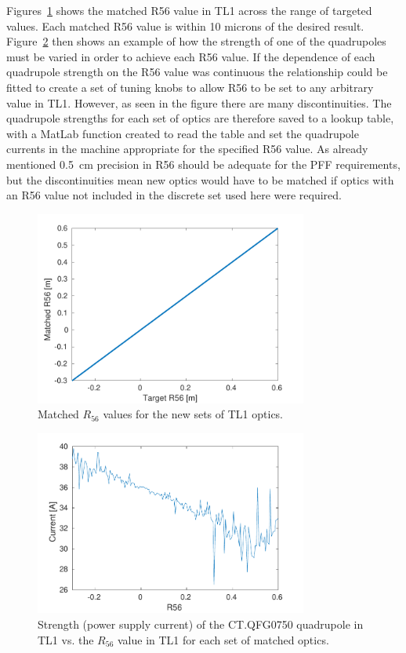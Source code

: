 Figures~\ref{f:r56MatchedVsTarget} shows the matched R56 value in TL1 across the range of targeted values. Each matched R56 value is within 10 microns of the desired result. Figure~\ref{f:CTQFG0750} then shows an example of how the strength of one of the quadrupoles must be varied in order to achieve each R56 value. If the dependence of each quadrupole strength on the R56 value was continuous the relationship could be fitted to create a set of tuning knobs to allow R56 to be set to any arbitrary value in TL1. However, as seen in the figure there are many discontinuities. The quadrupole strengths for each set of optics are therefore saved to a lookup table, with a MatLab function created to read the table and set the quadrupole currents in the machine appropriate for the specified R56 value. As already mentioned 0.5~cm precision in R56 should be adequate for the PFF requirements, but the discontinuities mean new optics would have to be matched if optics with an R56 value not included in the discrete set used here were required.

\begin{figure}
  \centering
  \includegraphics[width=0.8\textwidth]{Figures/propagation/r56MatchedVsTarget}
  \caption{Matched \(R_{56}\) values for the new sets of TL1 optics.}
  \label{f:r56MatchedVsTarget}
\end{figure}

\begin{figure}
  \centering
  \includegraphics[width=0.8\textwidth]{Figures/propagation/CTQFG0750}
  \caption{Strength (power supply current) of the CT.QFG0750 quadrupole in TL1 vs. the \(R_{56}\) value in TL1 for each set of matched optics.}
  \label{f:CTQFG0750}
\end{figure}

